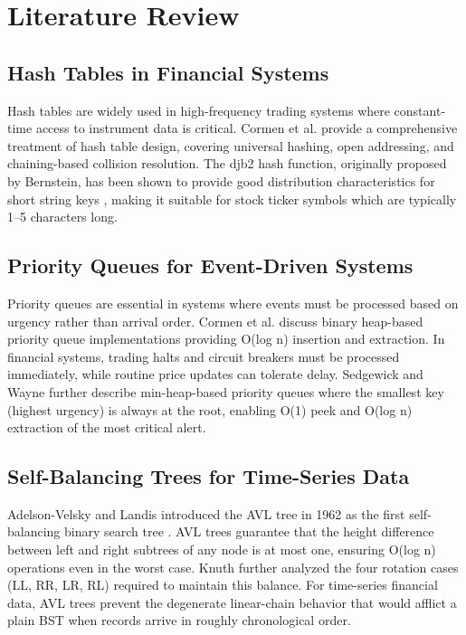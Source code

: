 \documentclass[conference]{IEEEtran}
\begin{document}
\section{Literature Review}

\subsection{Hash Tables in Financial Systems}

Hash tables are widely used in high-frequency trading systems where constant-time access to instrument data is critical. Cormen et al. \cite{b2} provide a comprehensive treatment of hash table design, covering universal hashing, open addressing, and chaining-based collision resolution. The djb2 hash function, originally proposed by Bernstein, has been shown to provide good distribution characteristics for short string keys \cite{b3}, making it suitable for stock ticker symbols which are typically 1--5 characters long.

\subsection{Priority Queues for Event-Driven Systems}

Priority queues are essential in systems where events must be processed based on urgency rather than arrival order. Cormen et al. \cite{b2} discuss binary heap-based priority queue implementations providing O(log n) insertion and extraction. In financial systems, trading halts and circuit breakers must be processed immediately, while routine price updates can tolerate delay. Sedgewick and Wayne \cite{b4} further describe min-heap-based priority queues where the smallest key (highest urgency) is always at the root, enabling O(1) peek and O(log n) extraction of the most critical alert.

\subsection{Self-Balancing Trees for Time-Series Data}

Adelson-Velsky and Landis introduced the AVL tree in 1962 as the first self-balancing binary search tree \cite{b5}. AVL trees guarantee that the height difference between left and right subtrees of any node is at most one, ensuring O(log n) operations even in the worst case. Knuth \cite{b6} further analyzed the four rotation cases (LL, RR, LR, RL) required to maintain this balance. For time-series financial data, AVL trees prevent the degenerate linear-chain behavior that would afflict a plain BST when records arrive in roughly chronological order.
\end{document}
